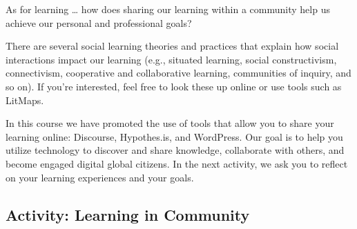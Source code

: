 \documentclass[
  letterpaper,
  DIV=11,
  numbers=noendperiod]{scrreprt}
\begin{document}
As for learning \ldots{} how does sharing our learning within a
community help us achieve our personal and professional goals?

There are several social learning theories and practices that explain
how social interactions impact our learning (e.g., situated learning,
social constructivism, connectivism, cooperative and collaborative
learning, communities of inquiry, and so on). If you're interested, feel
free to look these up online or use tools such as LitMaps.

In this course we have promoted the use of tools that allow you to share
your learning online: Discourse, Hypothes.is, and WordPress. Our goal is
to help you utilize technology to discover and share knowledge,
collaborate with others, and become engaged digital global citizens. In
the next activity, we ask you to reflect on your learning experiences
and your goals.

\subsection{Activity: Learning in
Community}\label{activity-learning-in-community}
\end{document}
